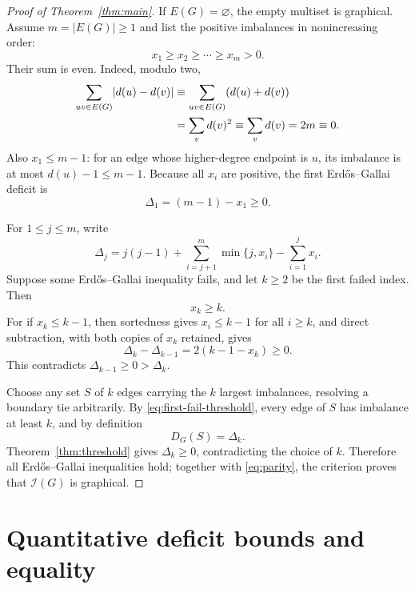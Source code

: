 \documentclass[a4paper,11pt]{amsart}
\numberwithin{equation}{section}
\theoremstyle{definition}
\theoremstyle{remark}
\newcommand{\Ical}{\mathcal I}
\begin{document}
\begin{proof}[Proof of Theorem~\ref{thm:main}]
If $E(G)=\varnothing$, the empty multiset is graphical.  Assume $m=\lvert E(G)\rvert\ge1$ and list the positive imbalances in nonincreasing order:
\begin{equation}
x_1\ge x_2\ge\cdots\ge x_m>0.
\label{eq:sorted-x}
\end{equation}
Their sum is even.  Indeed, modulo two,
\begin{align}
\sum_{uv\in E(G)}\lvert d(u)-d(v)\rvert
&\equiv\sum_{uv\in E(G)}(d(u)+d(v))\notag\\
&=\sum_vd(v)^2
\equiv\sum_vd(v)=2m\equiv0.
\label{eq:parity}
\end{align}
Also $x_1\le m-1$: for an edge whose higher-degree endpoint is $u$, its imbalance is at most $d(u)-1\le m-1$.  Because all $x_i$ are positive, the first Erd\H{o}s--Gallai deficit is
\[
\Delta_1=(m-1)-x_1\ge0.
\]

For $1\le j\le m$, write
\begin{equation}
\Delta_j=j(j-1)+\sum_{i=j+1}^m\min\{j,x_i\}-\sum_{i=1}^jx_i.
\label{eq:Delta}
\end{equation}
Suppose some Erd\H{o}s--Gallai inequality fails, and let $k\ge2$ be the first failed index.  Then
\begin{equation}
x_k\ge k.
\label{eq:first-fail-threshold}
\end{equation}
For if $x_k\le k-1$, then sortedness gives $x_i\le k-1$ for all $i\ge k$, and direct subtraction, with both copies of $x_k$ retained, gives
\begin{equation}
\Delta_k-\Delta_{k-1}=2(k-1-x_k)\ge0.
\label{eq:first-fail-subtraction}
\end{equation}
This contradicts $\Delta_{k-1}\ge0>\Delta_k$.

Choose any set $S$ of $k$ edges carrying the $k$ largest imbalances, resolving a boundary tie arbitrarily.  By \eqref{eq:first-fail-threshold}, every edge of $S$ has imbalance at least $k$, and by definition
\[
D_G(S)=\Delta_k.
\]
Theorem~\ref{thm:threshold} gives $\Delta_k\ge0$, contradicting the choice of $k$.  Therefore all Erd\H{o}s--Gallai inequalities hold; together with \eqref{eq:parity}, the criterion proves that $\Ical(G)$ is graphical.
\end{proof}

\section{Quantitative deficit bounds and equality}\label{sec:equality}
\end{document}
